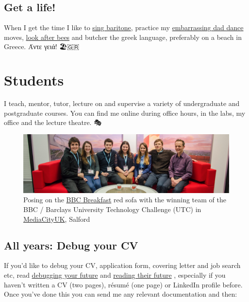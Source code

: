 \documentclass[
  12pt,
]{book}
\begin{document}
\hypertarget{get-a-life}{%
\section*{Get a life!}\label{get-a-life}}

When I get the time I like to \href{https://en.wikipedia.org/wiki/Baritone}{sing baritone}, practice my \protect\hyperlink{tuningcomplete}{embarrassing dad dance} moves, \href{http://beelife.cs.manchester.ac.uk/}{look after bees} and butcher the greek language, preferably on a beach in Greece. Άντε γειά! 🏖️🇬🇷

\hypertarget{teaching}{%
\chapter{Students}\label{teaching}}

I teach, mentor, tutor, lecture on and supervise a variety of undergraduate and postgraduate courses. You can find me online during office hours, in the labs, my office and the lecture theatre. 🎭

\begin{figure}

{\centering \includegraphics[width=1\linewidth]{images/bbcbreakfastsofa} 

}

\caption{Posing on the \href{https://en.wikipedia.org/wiki/BBC_Breakfast}{BBC Breakfast} red sofa with the winning team of the BBC / Barclays University Technology Challenge (UTC) in \href{https://en.wikipedia.org/wiki/MediaCityUK}{MediaCityUK}, Salford}\label{fig:unnamed-chunk-1}
\end{figure}



\hypertarget{allyears}{%
\section{All years: Debug your CV}\label{allyears}}

If you'd like to debug your CV, application form, covering letter and job search etc, read \href{https://www.cdyf.me/debugging.html}{debugging your future} \citep{debugyourfuture} and \href{https://www.cdyf.me/sampling.html}{reading their future} \citep{readingtheirfuture}, especially if you haven't written a CV (two pages), résumé (one page) or LinkedIn profile before. Once you've done this you can send me any relevant documentation and then:
\end{document}
